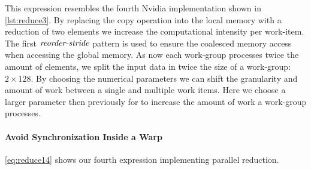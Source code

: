 %
This expression resembles the fourth Nvidia implementation shown in \autoref{lst:reduce3}.
By replacing the copy operation into the local memory with a reduction of two elements we increase the computational intensity per work-item.
The first $\text{\textit{reorder-stride}}$ pattern is used to ensure the coalesced memory access when accessing the global memory.
As now each work-group processes twice the amount of elements, we split the input data in twice the size of a work-group: $2\times 128$.
By choosing the numerical parameters we can shift the granularity and amount of work between a single and multiple work items.
Here we choose a larger parameter then previously for \splitN to increase the amount of work a work-group processes.

\paragraph{Avoid Synchronization Inside a Warp}
\autoref{eq:reduce14} shows our fourth expression implementing parallel reduction.
